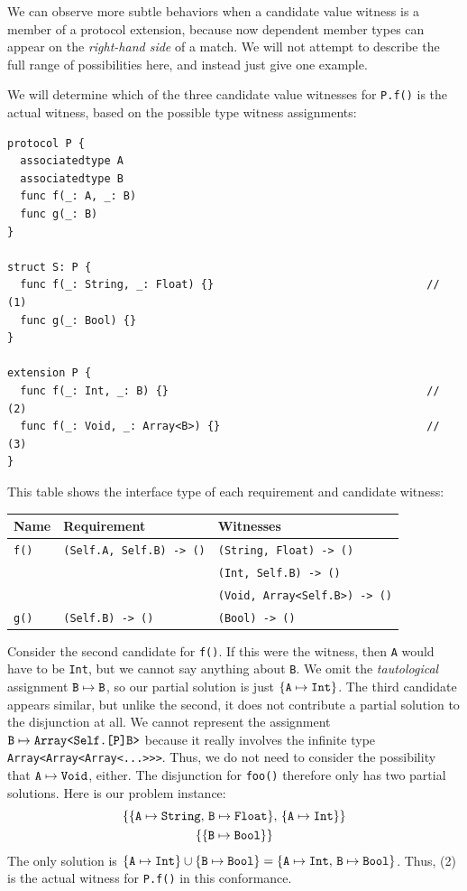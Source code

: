 \documentclass[../generics]{subfiles}
\begin{document}
We can observe more subtle behaviors when a candidate value witness is a member of a protocol extension, because now dependent member types can appear on the \emph{right-hand side} of a match. We will not attempt to describe the full range of possibilities here, and instead just give one example.

\begin{example}
We will determine which of the three candidate value witnesses for \verb|P.f()| is the actual witness, based on the possible type witness assignments:
\begin{Verbatim}
protocol P {
  associatedtype A
  associatedtype B
  func f(_: A, _: B)
  func g(_: B)
}

struct S: P {
  func f(_: String, _: Float) {}                                 // (1)
  func g(_: Bool) {}
}

extension P {
  func f(_: Int, _: B) {}                                        // (2)
  func f(_: Void, _: Array<B>) {}                                // (3)
}
\end{Verbatim}
This table shows the interface type of each requirement and candidate witness:
\begin{center}
\begin{tabular}{lll}
\toprule
\textbf{Name}&\textbf{Requirement}&\textbf{Witnesses}\\
\midrule
\verb|f()|&\verb|(Self.A, Self.B) -> ()|&\verb|(String, Float) -> ()|\\
&&\verb|(Int, Self.B) -> ()|\\
&&\verb|(Void, Array<Self.B>) -> ()|\\
\midrule
\verb|g()|&\verb|(Self.B) -> ()|&\verb|(Bool) -> ()|\\
\bottomrule
\end{tabular}
\end{center}

Consider the second candidate for \verb|f()|. If this were the witness, then \texttt{A} would have to be \texttt{Int}, but we cannot say anything about \texttt{B}. We omit the \emph{tautological} assignment $\texttt{B} \mapsto \texttt{B}$, so our partial solution is just $\{\texttt{A} \mapsto \texttt{Int}\}$. The third candidate appears similar, but unlike the second, it does not contribute a partial solution to the disjunction at all. We cannot represent the assignment $\texttt{B} \mapsto \texttt{Array<Self.[P]B>}$ because it really involves the infinite type \texttt{Array<Array<Array<...>>>}. Thus, we do not need to consider the possibility that $\texttt{A} \mapsto \texttt{Void}$, either. The disjunction for \verb|foo()| therefore only has two partial solutions. Here is our problem instance:
\begin{gather*}
\{ \{ \texttt{A} \mapsto \texttt{String},\, \texttt{B} \mapsto \texttt{Float} \},\, \{ \texttt{A} \mapsto \texttt{Int} \}\}\\
\{ \{ \texttt{B} \mapsto \texttt{Bool} \} \}
\end{gather*}
The only solution is $\{ \texttt{A} \mapsto \texttt{Int} \} \cup \{ \texttt{B} \mapsto \texttt{Bool} \} = \{ \texttt{A} \mapsto \texttt{Int},\, \texttt{B} \mapsto \texttt{Bool}\}$. Thus, (2) is the actual witness for \verb|P.f()| in this conformance.
\end{example}
\end{document}
